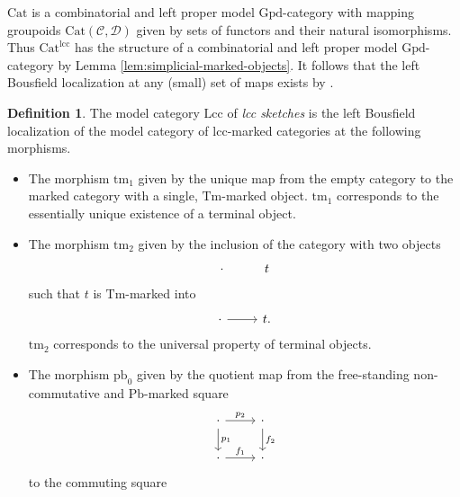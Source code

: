 \documentclass[a4paper]{article}
\theoremstyle{remark}
\theoremstyle{definition}
\newtheorem{definition}[theorem]{Definition}
\begin{document}
$\mathrm{Cat}$ is a combinatorial and left proper model $\mathrm{Gpd}$-category with mapping groupoids $\mathrm{Cat}(\mathcal{C}, \mathcal{D})$ given by sets of functors and their natural isomorphisms.
Thus $\mathrm{Cat}^{\mathrm{lcc}}$ has the structure of a combinatorial and left proper model $\mathrm{Gpd}$-category by Lemma \ref{lem:simplicial-marked-objects}.
It follows that the left Bousfield localization at any (small) set of maps exists by \citet[Theorem 4.1.1]{hirschhorn}.

\begin{definition}
  \label{def:lcc-axioms}
  The model category $\mathrm{Lcc}$ of \emph{lcc sketches} is the left Bousfield localization of the model category of $\mathrm{lcc}$-marked categories at the following morphisms.
  \begin{itemize}
    \item
      The morphism $\mathrm{tm}_1$ given by the unique map from the empty category to the marked category with a single, $\mathrm{Tm}$-marked object.
      $\mathrm{tm}_1$ corresponds to the essentially unique existence of a terminal object.
    \item
      The morphism $\mathrm{tm}_2$ given by the inclusion of the category with two objects
      \begin{equation}
        \begin{tikzcd}
          \cdot & t
        \end{tikzcd}
      \end{equation}
      such that $t$ is $\mathrm{Tm}$-marked into
      \begin{equation}
          \begin{tikzcd}
            \cdot \arrow[r] & t.
          \end{tikzcd}
      \end{equation}
      $\mathrm{tm}_2$ corresponds to the universal property of terminal objects.
    \item
      \label{itm:pbs-commute}
      The morphism $\mathrm{pb}_0$ given by the quotient map from the free-standing non-commutative and $\mathrm{Pb}$-marked square
      \begin{equation}
        \begin{tikzcd}
          \cdot \arrow[r, "p_2"] \arrow[d, "p_1"] & \cdot \arrow[d, "f_2"] \\
          \cdot \arrow[r, "f_1"] & \cdot
        \end{tikzcd}
      \end{equation}
      to the commuting square

\end{itemize}
\end{definition}
\end{document}
